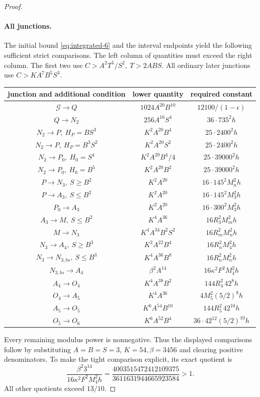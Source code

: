 \documentclass[12pt]{article}
\numberwithin{equation}{section}
\begin{document}
\begin{proof}
\paragraph{All junctions.}
The initial bound \eqref{eq:integrated-6} and the interval endpoints yield the following
sufficient strict comparisons. The left column of quantities must exceed
the right column. The first two use \(C>A^2T^5/S^2,\ T>2ABS\).
All ordinary later junctions use \(C>KA^7B^5S^3\).
\begin{center}\small
\begin{tabular}{c|c|c}
junction and additional condition&lower quantity&required constant\\\hline
\(\mathcal G\to Q\)&\(1024A^{20}B^{10}\)&\(12100/(1-\epsilon)\)\\
\(Q\to N_2\)&\(256A^{16}S^4\)&\(36\cdot735^2h\)\\
\(N_2\to P,\ H_P=BS^3\)&\(K^2A^{20}B^4\)&\(25\cdot2400^2h\)\\
\(N_2\to P,\ H_P=B^3S^2\)&\(K^2A^{20}S^2\)&\(25\cdot2400^2h\)\\
\(N_2\to P_0,\ H_0=S^4\)&\(K^2A^{20}B^4/4\)&\(25\cdot39000^2h\)\\
\(N_2\to P_0,\ H_0=B^5\)&\(K^2A^{20}B^2\)&\(25\cdot39000^2h\)\\
\(P\to N_3,\ S\ge B^2\)&\(K^2A^{20}\)&\(16\cdot145^2M_n^2h\)\\
\(P\to A_3,\ S\le B^2\)&\(K^2A^{20}\)&\(16\cdot145^2M_3^2h\)\\
\(P_0\to A_3\)&\(K^2A^{20}\)&\(16\cdot300^2M_3^2h\)\\
\(A_3\to M,\ S\le B^2\)&\(K^4A^{36}\)&\(16R_3^2M_m^2h\)\\
\(M\to N_3\)&\(K^4A^{34}B^2S^2\)&\(16R_m^2M_n^2h\)\\
\(N_3\to A_4,\ S\ge B^3\)&\(K^2A^{22}B^4\)&\(16R_n^2M_4^2h\)\\
\(N_3\to N_{3,bs},\ S\le B^3\)&\(K^4A^{36}B^8\)&\(16R_n^2M_n^2h\)\\
\(N_{3,bs}\to A_4\)&\(\beta^2A^{14}\)&\(16\kappa^2F^2M_4^2h\)\\
\(A_4\to O_4\)&\(K^4A^{38}B^2\)&\(144R_4^2\,42^8h\)\\
\(O_4\to A_5\)&\(K^4A^{36}\)&\(4M_5^2(5/2)^8h\)\\
\(A_5\to O_5\)&\(K^6A^{54}B^{10}\)&\(144R_5^2\,42^{10}h\)\\
\(O_5\to O_6\)&\(K^6A^{52}B^4\)&\(36\cdot42^{12}(5/2)^{10}h\)
\end{tabular}
\end{center}
Every remaining modulus power is nonnegative. Thus the displayed
comparisons follow by substituting \(A=B=S=3\), \(K=54,\beta=3456\)
and clearing positive denominators. To make the tight comparison
explicit, its exact quotient is
\[
 \frac{\beta^2 3^{14}}{16\kappa^2F^2M_4^2h}
 =\frac{4003515472412109375}{3611631944665923584}>1.
\]
All other quotients exceed \(13/10\).


\end{proof}
\end{document}
